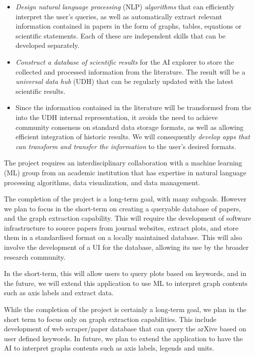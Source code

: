 \documentclass{article}[12pt,preprint]
\begin{document}
\begin{itemize}

\item
{\it Design natural language processing} (NLP) {\it algorithms} that
can efficiently interpret the user's queries, as well as automatically
extract relevant information contained in papers in the form of graphs,
tables, equations or scientific statements.  Each of these are
independent skills that can be developed separately.

\item
{\it Construct a database of scientific results} for the AI explorer
to store the collected and processed information from the literature.
The result will be a \emph{universal data hub} (UDH) that can be
regularly updated with the latest scientific results.

\item 
Since the information contained in the literature will be transformed
from the into the UDH internal representation, it avoids the need to
achieve community consensus on standard data storage formats, as well as
allowing efficient integration of historic results.
We will consequently {\it develop apps that can transform and transfer
the information} to the user's desired formats.

\end{itemize}

The project requires an interdisciplinary collaboration with a
machine learning (ML) group from an academic institution that
has expertise in natural language processing algorithms, data
visualization, and data management.  

The completion of the project is a long-term goal, with many subgoals. However we plan to focus in the short-term on creating a queryable database of papers, and the graph extraction capability. This will require the development of software infrastructure to source papers from journal websites, extract plots, and store them in a standardised format on a locally maintained database. This will also involve the development of a UI for the database, allowing its use by the broader research community. 

In the short-term, this will allow users to query plots based on keywords, and in the future, we will extend this application to use ML to interpret graph contents such as axis labels and extract data.

{\color{red}
While the completion of the project is certainly a long-term goal, 
we plan in the short term to focus only on graph extraction capabilities.
This include development of web scraper/paper database that can 
query the arXive based on user defined keywords. In future, we plan to
extend the application to have the AI to interpret  graphs contents 
such as axis labels, legends and units.
}
\end{document}
